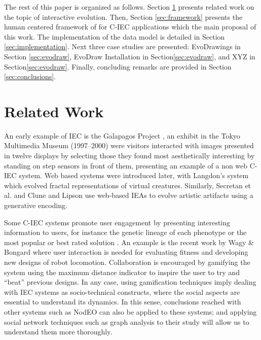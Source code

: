 The rest of this paper is organized as follows.
Section \ref{sec:related} presents related work on the topic 
of interactive evolution. Then, Section \ref{sec:framework} presents the human centered framework of
for C-IEC applications which the main proposal of this work. The implementation of the data model
is detailed in Section \ref{sec:implementation}. %
Next three case studies are presented: EvoDrawings in
Section \ref{sec:evodraw}, EvoDraw Installation in Section\ref{sec:evodraw}, 
and XYZ in Section\ref{sec:evodraw}. Finally, concluding remarks are provided 
in Section \ref{sec:conclusions}.

\section{Related Work}
\label{sec:related}

An early example of IEC is the Galapagos Project \cite{sims1997interactivity},
an exhibit in the Tokyo Multimedia Museum (1997--2000) 
were visitors interacted with images presented in 
twelve displays by selecting those they found most aesthetically interesting by standing on
step sensors in front of them, presenting an example of a non web
C-IEC system. Web based systems were introduced later, with  
Langdon's system \cite{langdon:2004} which evolved fractal representations of virtual creatures. 
Similarly, Secretan et al. \cite{picbreeder} and Clune and Lipson \cite{forms} 
use web-based IEAs to evolve artistic artifacts using a generative encoding.

Some C-IEC systems promote user engagement by presenting interesting information to 
users, for instance the genetic lineage of each phenotype or the most popular or 
best rated solution \cite{picbreeder,forms}. An example is the recent work by 
Wagy \& Bongard \cite{wagy2014collective} where user interaction 
is needed for evaluating fitness and developing
new designs of robot locomotion. Collaboration is encouraged by gamifying the system 
using the maximum distance indicator to inspire the user to try and ``beat'' previous designs. 
In any case, using gamification techniques imply dealing with IEC
systems as socio-technical constructs, where the social aspects are
essential to understand its dynamics. In this sense, conclusions
reached with other systems such as NodEO \cite{DBLP:conf/gecco/MereloCGCRV16}
can also be applied to these systems; and applying social 
network techniques such as graph analysis
to their study will allow us to understand them more thoroughly. 

